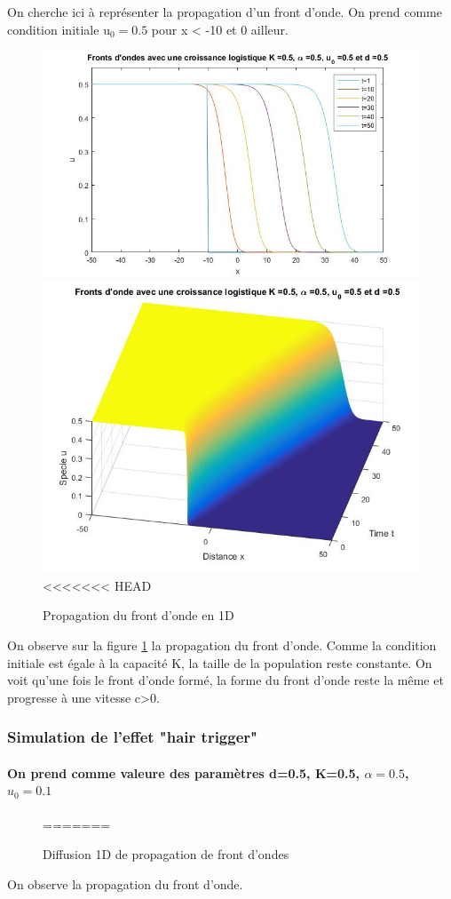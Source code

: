 \documentclass[a4paper,11pt]{article}
\begin{document}
On cherche ici à représenter la propagation d'un front d'onde. On prend comme condition initiale u$_0=0.5$ pour x < -10 et 0 ailleur. 
\begin{figure}[!h]
	\centering
	\includegraphics[width=0.55\linewidth]{SimulationKPP/figures1/FrontOnde2}\hfill
	\includegraphics[width=0.40\linewidth]{SimulationKPP/figures1/FrontOnde1}\hfill
<<<<<<< HEAD
	\caption{Propagation du front d'onde en 1D}
	\label{front}
\end{figure}
\noindent

On observe sur la figure \ref{front} la propagation du front d'onde. Comme la condition initiale est égale à la capacité K, la taille de la population reste constante. On voit qu'une fois le front d'onde formé, la forme du front d'onde reste la même et progresse à une vitesse c>0.  

\subsubsection{Simulation de l'effet "hair trigger"}
\paragraph{On prend comme valeure des paramètres d=0.5, K=0.5, $\alpha =0.5$, $u_0=0.1$ }

\begin{figure}[!h]
=======
	\caption{Diffusion 1D de propagation de front d'ondes}
\end{figure}
\noindent

On observe la propagation du front d'onde.
\end{document}
